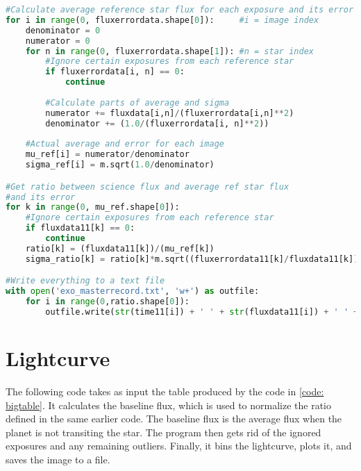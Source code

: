 \documentclass{aastex}
\begin{document}
\begin{lstlisting}[language = Python, caption = Creates table of values to be used for the final light curve (YM and JM)]
#Calculate average reference star flux for each exposure and its error
for i in range(0, fluxerrordata.shape[0]):     #i = image index
	denominator = 0
	numerator = 0
	for n in range(0, fluxerrordata.shape[1]): #n = star index
		#Ignore certain exposures from each reference star
		if fluxerrordata[i, n] == 0:
			continue
		
		#Calculate parts of average and sigma
		numerator += fluxdata[i,n]/(fluxerrordata[i,n]**2)
		denominator += (1.0/(fluxerrordata[i, n]**2))
	
	#Actual average and error for each image
	mu_ref[i] = numerator/denominator
	sigma_ref[i] = m.sqrt(1.0/denominator)

#Get ratio between science flux and average ref star flux
#and its error
for k in range(0, mu_ref.shape[0]):
	#Ignore certain exposures from each reference star
	if fluxdata11[k] == 0:
		continue
	ratio[k] = (fluxdata11[k])/(mu_ref[k])
	sigma_ratio[k] = ratio[k]*m.sqrt((fluxerrordata11[k]/fluxdata11[k])**2+(sigma_ref[k]/mu_ref[k])**2)

#Write everything to a text file
with open('exo_masterrecord.txt', 'w+') as outfile:
	for i in range(0,ratio.shape[0]):
		outfile.write(str(time11[i]) + ' ' + str(fluxdata11[i]) + ' ' + str(fluxerrordata11[0]) + ' ' + str(mu_ref[i]) + ' ' + str(ratio[i]) + ' ' + str(sigma_ratio[i]) + '\n')
\end{lstlisting}

\appendix
\section{Lightcurve} \label{code: lightcurve}
The following code takes as input the table produced by the code in \ref{code: bigtable}. It calculates the baseline flux, which is used to normalize the ratio defined in the same earlier code. The baseline flux is the average flux when the planet is not transiting the star. The program then gets rid of the ignored exposures and any remaining outliers. Finally, it bins the lightcurve, plots it, and saves the image to a file. 
\end{document}
